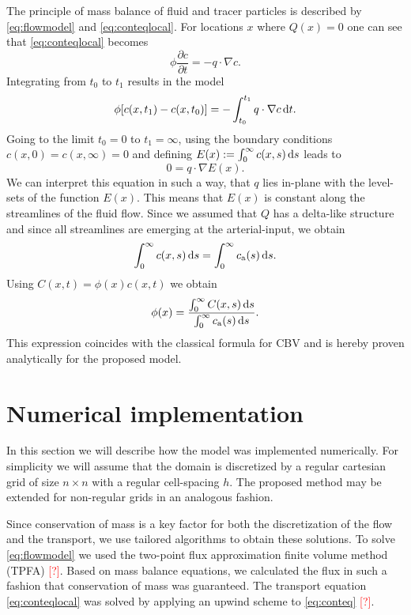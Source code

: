 \documentclass[paper=a4, fontsize=12pt,parskip=half,headings=small]{scrartcl}
\newcommand{\ca}{c_\mathrm{a}}
\newcommand{\missingsource}{\textcolor{red}{[?]}}
\begin{document}
	The principle of mass balance of fluid and tracer particles is described by \eqref{eq:flowmodel} and \eqref{eq:conteqlocal}. 
	For locations $x$ where $Q(x) = 0$ one can see that \eqref{eq:conteqlocal} becomes
	\[
		\phi\frac{\partial c}{\partial t}  = - q \cdot \nabla c.
		\label{eq:1cmodel}
	\]
	Integrating from $t_0$ to $t_1$ results in the model
	\[
		\phi [c(x,t_1) - c(x,t_0)]  = - \int_{t_0}^{t_1}q \cdot  \nabla c \,\mathrm{d} t.
	\]
	Going to the limit $t_0 = 0$ to $t_1 = \infty$, using the boundary conditions $c(x,0) = c(x,\infty) = 0$ and defining $E(x):= \int_0^\infty c(x,s) \,\mathrm{d} s$ leads to
	\[
		0 = q \cdot \nabla  E(x).
		\label{eq:streamlinezero}
	\]
	We can interpret this equation in such a way, that $q$ lies in-plane with the level-sets of the function $E(x)$.
	This means that $E(x)$ is constant along the streamlines of the fluid flow.
	Since we assumed that $Q$ has a delta-like structure and since all streamlines are emerging at the arterial-input, we obtain
	\[
		\int_0^\infty c(x,s) \diffint s = \int_0^\infty \ca(s) \diffint s.
	\]
	Using $C(x,t) = \phi(x) c(x,t)$ we obtain
	\begin{equation}
		\phi(x) =  \frac{ \int_{0}^{\infty} C(x,s) \diffint s }{ \int_{0}^{\infty} \ca(s) \diffint s}.
		\label{eq:phi}
	\end{equation}
	This expression coincides with the classical formula for CBV and is hereby proven analytically for the proposed model.
	
	

	
	\section{Numerical implementation}
	
	In this section we will describe how the model was implemented numerically.
	For simplicity we will assume that the domain is discretized by a regular cartesian grid of size $n \times n$ with a regular cell-spacing $h$.
	The proposed method may be extended for non-regular grids in an analogous fashion.
	
	Since conservation of mass is a key factor for both the discretization of the flow and the transport, we use tailored algorithms to obtain these solutions.
	To solve \eqref{eq:flowmodel} we used the two-point flux approximation finite volume method (TPFA) \missingsource. 
	Based on mass balance equations, we calculated the flux in such a fashion that conservation of mass was guaranteed.
	The transport equation \eqref{eq:conteqlocal} was solved by applying an upwind scheme to \eqref{eq:conteq} \missingsource.
\end{document}
